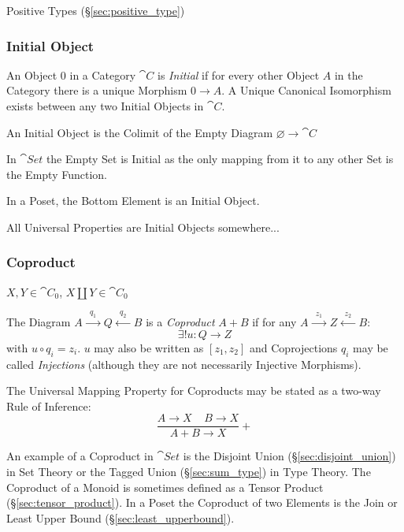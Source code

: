 Positive Types (\S\ref{sec:positive_type})



\subsubsection{Initial Object}\label{sec:initial_object}

An Object $0$ in a Category $\cat{C}$ is \emph{Initial} if for
every other Object $A$ in the Category there is a unique Morphism $0
\rightarrow A$. A Unique Canonical Isomorphism exists between any two
Initial Objects in $\cat{C}$.

An Initial Object is the Colimit of the Empty Diagram $\varnothing
\rightarrow \cat{C}$

In $\cat{Set}$ the Empty Set is Initial as the only mapping from it
to any other Set is the Empty Function.

In a Poset, the Bottom Element is an Initial Object.

All Universal Properties are Initial Objects somewhere...



\subsubsection{Coproduct}\label{sec:coproduct}

$X,Y \in \cat{C}_0$, $X \amalg Y \in \cat{C}_0$

The Diagram $A \xrightarrow{\;\;q_1\;\;} Q \xleftarrow{\;\;q_2\;\;} B$
is a \emph{Coproduct} $A + B$ if for any $A \xrightarrow{\;\;z_1\;\;}
Z \xleftarrow{\;\;z_2\;\;} B$:
\[
  \exists!u : Q \rightarrow Z
\]
with $u \circ q_i = z_i$. $u$ may also be written as $[ z_1, z_2 ]$
and Coprojections $q_i$ may be called \emph{Injections} (although they
are not necessarily Injective Morphisms).

The Universal Mapping Property for Coproducts may be stated as a
two-way Rule of Inference:
\[
  {
    \frac{A \rightarrow X \;\;\;\; B \rightarrow X}
    {A + B \rightarrow X}
  }+
\]

An example of a Coproduct in $\cat{Set}$ is the Disjoint Union
(\S\ref{sec:disjoint_union}) in Set Theory or the Tagged Union
(\S\ref{sec:sum_type}) in Type Theory. The Coproduct of a Monoid is
sometimes defined as a Tensor Product (\S\ref{sec:tensor_product}). In
a Poset the Coproduct of two Elements is the Join or Least Upper Bound
(\S\ref{sec:least_upperbound}).

